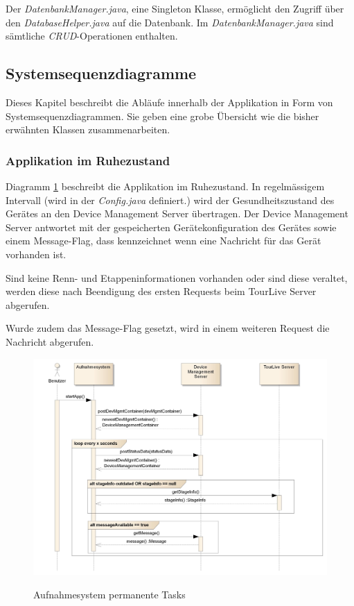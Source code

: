 Der \textit{DatenbankManager.java}, eine Singleton Klasse, ermöglicht den Zugriff über den \textit{DatabaseHelper.java} auf die Datenbank. Im \textit{DatenbankManager.java} sind sämtliche \textit{\gls{CRUD}}-Operationen enthalten.

\subsection{Systemsequenzdiagramme}
Dieses Kapitel beschreibt die Abläufe innerhalb der Applikation in Form von Systemsequenzdiagrammen. Sie geben eine grobe Übersicht wie die bisher erwähnten Klassen zusammenarbeiten.

\subsubsection{Applikation im Ruhezustand}
Diagramm \ref{fig:permanenttasks} beschreibt die Applikation im Ruhezustand. In regelmässigem Intervall (wird in der \textit{Config.java} definiert.) wird der Gesundheitszustand des Gerätes an den Device Management Server übertragen. Der Device Management Server antwortet mit der gespeicherten Gerätekonfiguration des Gerätes sowie einem Message-Flag, dass kennzeichnet wenn eine Nachricht für das Gerät vorhanden ist. 

Sind keine Renn- und Etappeninformationen vorhanden oder sind diese veraltet, werden diese nach Beendigung des ersten Requests beim TourLive Server abgerufen.

Wurde zudem das Message-Flag gesetzt, wird in einem weiteren Request die Nachricht abgerufen. 

 
\begin{figure}[H]
	\centering
	\includegraphics[width=130mm]{images/android/permanent_taskes.jpg}
	\label{fig:permanenttasks}
	\caption{Aufnahmesystem permanente Tasks}
\end{figure}

